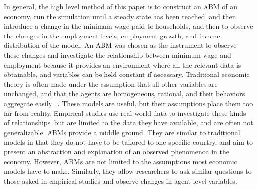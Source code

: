\documentclass[11pt]{article}
\begin{document}
In general, the high level method of this paper is to construct an ABM of an
economy, run the simulation until a steady state has been reached, and then
introduce a change in the minimum wage paid to households, and then to observe
the changes in the employment levels, employment growth, and income distribution
of the model. An ABM was chosen as the instrument to observe these changes and
investigate the relationship between minimum wage and employment because it
provides an environment where all the relevant data is obtainable, and variables
can be held constant if necessary. Traditional economic theory is often made
under the assumption that all other variables are unchanged, and that the agents
are homogeneous, rational, and their behaviors aggregate easily ~\cite{Haldane-history-paper}.
These models are useful, but their assumptions place them too far from reality.
Empirical studies use real world data to investigate these kinds of relationships,
but are limited to the data they have available, and are often not generalizable.
ABMs provide a middle ground. They are similar to traditional models in that they
do not have to be tailored to one specific country, and aim to present an
abstraction and explanation of an observed phenomenon in the economy. However,
ABMs are not limited to the assumptions most economic models have to make.
Similarly, they allow researchers to ask similar questions to those asked in
empirical studies and observe changes in agent level variables.
\end{document}
